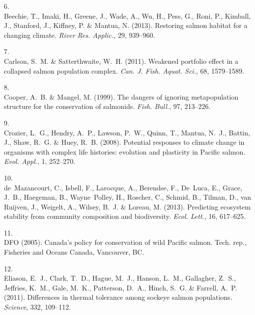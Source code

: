 \documentclass[11pt]{article}
\begin{document}
\begin{spacing}{1.6}
\begin{thebibliography}{50}
6.\\
Beechie, T., Imaki, H., Greene, J., Wade, A., Wu, H., Pess, G., Roni, P.,
  Kimball, J., Stanford, J., Kiffney, P. \& Mantua, N. (2013).
\newblock Restoring salmon habitat for a changing climate.
\newblock \emph{River Res. Applic.}, 29, 939--960.

7.\\
Carlson, S.~M. \& Satterthwaite, W.~H. (2011).
\newblock Weakened portfolio effect in a collapsed salmon population complex.
\newblock \emph{Can. J. Fish. Aquat. Sci.}, 68, 1579--1589.

8.\\
Cooper, A.~B. \& Mangel, M. (1999).
\newblock The dangers of ignoring metapopulation structure for the conservation
  of salmonids.
\newblock \emph{Fish. Bull.}, 97, 213--226.

9.\\
Crozier, L.~G., Hendry, A.~P., Lawson, P.~W., Quinn, T., Mantua, N.~J., Battin,
  J., Shaw, R.~G. \& Huey, R.~B. (2008).
\newblock Potential responses to climate change in organisms with complex life
  histories: evolution and plasticity in {Pacific} salmon.
\newblock \emph{Evol. Appl.}, 1, 252--270.

10.\\
de~Mazancourt, C., Isbell, F., Larocque, A., Berendse, F., De~Luca, E., Grace,
  J.~B., Haegeman, B., Wayne~Polley, H., Roscher, C., Schmid, B., Tilman, D.,
  van Ruijven, J., Weigelt, A., Wilsey, B.~J. \& Loreau, M. (2013).
\newblock Predicting ecosystem stability from community composition and
  biodiversity.
\newblock \emph{Ecol. Lett.}, 16, 617--625.

11.\\
DFO (2005).
\newblock Canada's policy for conservation of wild {Pacific} salmon.
\newblock Tech. rep., Fisheries and Oceans Canada, Vancouver, BC.

12.\\
Eliason, E.~J., Clark, T.~D., Hague, M.~J., Hanson, L.~M., Gallagher, Z.~S.,
  Jeffries, K.~M., Gale, M.~K., Patterson, D.~A., Hinch, S.~G. \& Farrell,
  A.~P. (2011).
\newblock Differences in thermal tolerance among sockeye salmon populations.
\newblock \emph{Science}, 332, 109--112.


\end{thebibliography}
\end{spacing}
\end{document}
